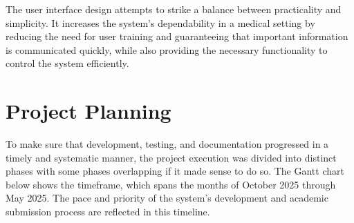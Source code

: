 The user interface design attempts to strike a balance between practicality and simplicity. It increases the system's dependability in a medical setting by reducing the need for user training and guaranteeing that important information is communicated quickly, while also providing the necessary functionality to control the system efficiently.

\section{Project Planning} %
To make sure that development, testing, and documentation progressed in a timely and systematic manner, the project execution was divided into distinct phases with some phases overlapping if it made sense to do so. The Gantt chart below shows the timeframe, which spans the months of October 2025 through May 2025. The pace and priority of the system's development and academic submission process are reflected in this timeline.



